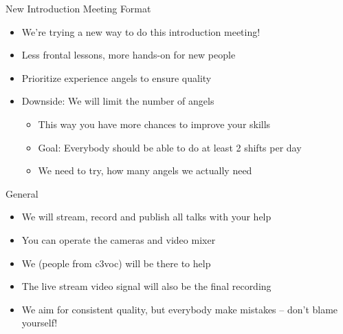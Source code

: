 
\begin{frame}{New Introduction Meeting Format}
	\begin{itemize}
		\item We're trying a new way to do this introduction meeting!
		\item Less frontal lessons, more hands-on for new people
		\item Prioritize experience angels to ensure quality
		\item Downside: We will limit the number of angels
		\begin{itemize}
			\item This way you have more chances to improve your skills
			\item Goal: Everybody should be able to do at least 2 shifts per day
			\item We need to try, how many angels we actually need
		\end{itemize}
	\end{itemize}
\end{frame}

\begin{frame}{General}
	\begin{itemize}
		\item We will stream, record and publish all talks with your help
		\item You can operate the cameras and video mixer
		\item We (people from c3voc) will be there to help
		\item The live stream video signal will also be the final recording
		\item We aim for consistent quality, but everybody make mistakes -- don't blame yourself!
	\end{itemize}
\end{frame}
